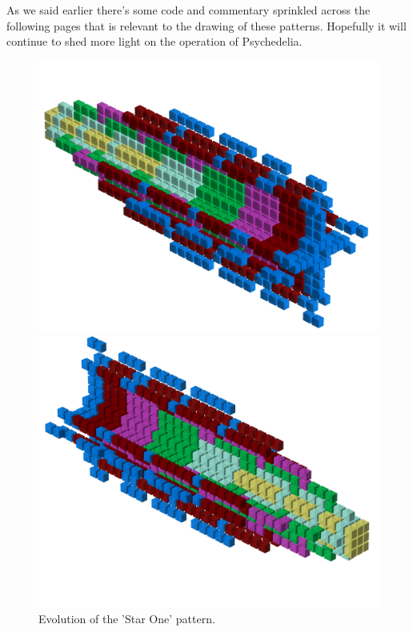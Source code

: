 As we said earlier there's some code and commentary sprinkled across the following pages that is relevant to the drawing
of these patterns. Hopefully it will continue to shed more light on the operation of Psychedelia.

\begin{figure}[H]
    \centering
    \begin{adjustbox}{width=13cm,center}
      \includegraphics[width=12cm]{src/patterns/pattern0-45.png}%
    \end{adjustbox}
    \begin{adjustbox}{width=13cm,margin=0cm -2cm}
      \includegraphics[width=12cm]{src/patterns/pattern0-225.png}%
    \end{adjustbox}
\caption{Evolution of the 'Star One' pattern.}
\end{figure}


